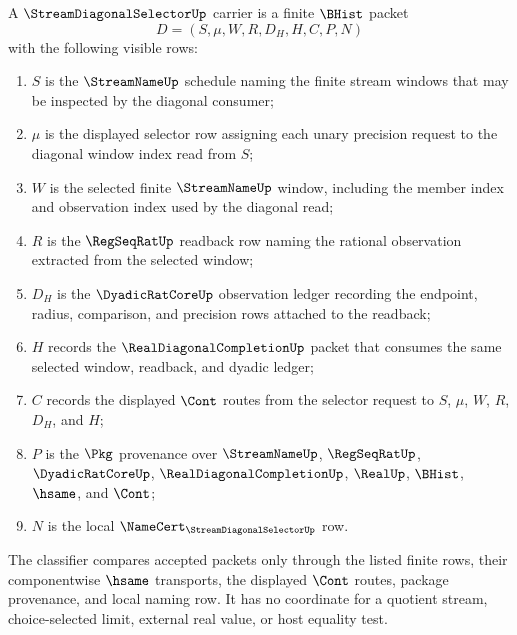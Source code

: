\begin{definition}
\label{def:stream-diagonal-selector-carrier}
A $\StreamDiagonalSelectorUp$ carrier is a finite $\BHist$ packet
$$
D=(S,\mu,W,R,D_H,H,C,P,N)
$$
with the following visible rows:
\begin{enumerate}
\item $S$ is the $\StreamNameUp$ schedule naming the finite stream windows that may be inspected by the diagonal consumer;
\item $\mu$ is the displayed selector row assigning each unary precision request to the diagonal window index read from $S$;
\item $W$ is the selected finite $\StreamNameUp$ window, including the member index and observation index used by the diagonal read;
\item $R$ is the $\RegSeqRatUp$ readback row naming the rational observation extracted from the selected window;
\item $D_H$ is the $\DyadicRatCoreUp$ observation ledger recording the endpoint, radius, comparison, and precision rows attached to the readback;
\item $H$ records the $\RealDiagonalCompletionUp$ packet that consumes the same selected window, readback, and dyadic ledger;
\item $C$ records the displayed $\Cont$ routes from the selector request to $S$, $\mu$, $W$, $R$, $D_H$, and $H$;
\item $P$ is the $\Pkg$ provenance over $\StreamNameUp$, $\RegSeqRatUp$, $\DyadicRatCoreUp$, $\RealDiagonalCompletionUp$, $\RealUp$, $\BHist$, $\hsame$, and $\Cont$;
\item $N$ is the local $\NameCert_{\StreamDiagonalSelectorUp}$ row.
\end{enumerate}
The classifier compares accepted packets only through the listed finite rows, their componentwise $\hsame$ transports, the displayed $\Cont$ routes, package provenance, and local naming row. It has no coordinate for a quotient stream, choice-selected limit, external real value, or host equality test.
\end{definition}

